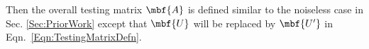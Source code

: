 \documentclass[conference,twocolumn]{IEEEtran}
\begin{document}
Then the overall testing matrix $\mbf{A}$ is defined similar to the noiseless case in Sec. \ref{Sec:PriorWork} except that $\mbf{U}$ will be replaced by $\mbf{U'}$ in Eqn.~\eqref{Eqn:TestingMatrixDefn}.  %

%
\end{document}
